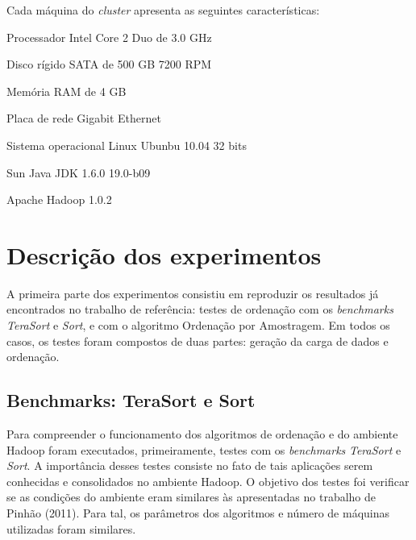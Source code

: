 
Cada máquina do \textit{cluster} apresenta as seguintes características:
\begin{packed_enum}
\item Processador Intel Core 2 Duo de 3.0 GHz
\item Disco rígido SATA de 500 GB 7200 RPM
\item Memória RAM de 4 GB
\item Placa de rede Gigabit Ethernet
\item Sistema operacional Linux Ubunbu 10.04 32 bits %
\item Sun Java JDK 1.6.0 19.0-b09 
\item Apache Hadoop 1.0.2
\end{packed_enum}


\section{Descrição dos experimentos}
\label{sec:experimentos}

A primeira parte dos experimentos consistiu em reproduzir os resultados já encontrados no trabalho de referência: testes de ordenação com os \textit{benchmarks TeraSort} e \textit{Sort}, e com o algoritmo Ordenação por Amostragem. 
Em todos os casos, os testes foram compostos de duas partes: geração da carga de dados e ordenação. 

\subsection{Benchmarks: TeraSort e Sort}

 
Para compreender o funcionamento dos algoritmos de ordenação e do ambiente Hadoop foram executados, primeiramente, testes com os \textit{benchmarks} \textit{TeraSort} e \textit{Sort}.  A importância desses testes consiste no fato de tais  aplicações serem conhecidas e consolidados no ambiente Hadoop. 
 O objetivo dos testes foi verificar se as condições do ambiente eram similares às apresentadas no trabalho de Pinhão (2011). Para tal, os parâmetros dos algoritmos e número de máquinas utilizadas foram similares. 

